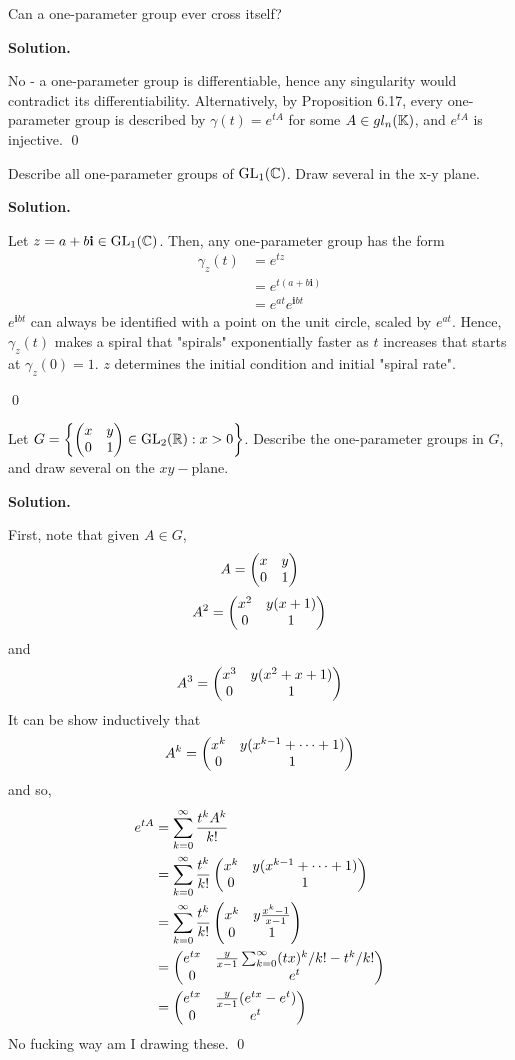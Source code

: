 \documentclass[12pt]{book}
\theoremstyle{definition}
\newenvironment{solution}
{%
  \par\noindent\textbf{Solution.}\quad
}
{%
  \qed\par
}
\begin{document}
\begin{taggedexercise}[Complete]
  Can a one-parameter group ever cross itself?
\end{taggedexercise}

\begin{solution}
  No - a one-parameter group is differentiable, hence any singularity would contradict its differentiability.
  Alternatively, by Proposition 6.17, every one-parameter group is described by $\gamma(t) = e^{tA}$ for some $A \in gl_n(\mathbb{K})$, and $e^{tA}$ is injective.
\end{solution}

\begin{taggedexercise}[WIP]
  Describe all one-parameter groups of $\mathrm{GL}_{1}(\mathbb{C})$.
  Draw several in the x-y plane.
\end{taggedexercise}

\begin{solution}
  Let $z = a + b\mathbf{i} \in \mathrm{GL}_{1}(\mathbb{C})$.
  Then, any one-parameter group has the form
  \[\begin{aligned}
    \gamma_z(t) &= e^{tz} \\
                &= e^{t(a+ b\mathbf{i})} \\
                &= e^{at}e^{\mathbf{i}bt}
  \end{aligned}
  \]
  $e^{\mathbf{i}bt}$ can always be identified with a point on the unit circle, scaled by $e^{at}$.
  Hence, $\gamma_z(t)$ makes a spiral that "spirals" exponentially faster as $t$ increases that starts at $\gamma_z(0) = 1$.
  $z$ determines the initial condition and initial "spiral rate".

\end{solution}

\begin{taggedexercise}[WIP]
  Let $G = \left\{ \begin{pmatrix} x & y \\ 0 & 1 \end{pmatrix} \in \mathrm{GL}_{2}(\mathbb{R}) : x > 0 \right\}$.
  Describe the one-parameter groups in $G$, and draw several on the $xy-$plane.
\end{taggedexercise}

\begin{solution}
  First, note that given $A \in G$,
  \[
   A = \begin{pmatrix} x & y \\ 0 & 1 \end{pmatrix}
  \]
  \[A^2 =  \begin{pmatrix} x^2 & y(x+1) \\ 0 & 1 \end{pmatrix}\]
  and
  \[A^3 = \begin{pmatrix} x^3 & y(x^2 + x + 1) \\ 0 & 1 \end{pmatrix}\]
  It can be show inductively that
  \[
  A^k = \begin{pmatrix} x^k & y(x^{k-1} + \cdots + 1) \\ 0 & 1 \end{pmatrix}
  \]
  and so,
  \[
  \begin{aligned}
    e^{tA} &= \sum_{k=0}^\infty \frac{t^kA^k}{k!} \\
           &= \sum_{k=0}^\infty \frac{t^k}{k!} \begin{pmatrix} x^k & y(x^{k-1} + \cdots + 1) \\ 0 & 1 \end{pmatrix} \\
           &= \sum_{k=0}^\infty \frac{t^k}{k!} \begin{pmatrix} x^k & y\frac{x^k-1}{x-1} \\ 0 & 1 \end{pmatrix} \\
           &= \begin{pmatrix} e^{tx} & \frac{y}{x-1}\sum_{k=0}^\infty (tx)^k/k! - t^k/k! \\ 0 & e^t \end{pmatrix} \\
           &= \begin{pmatrix} e^{tx} & \frac{y}{x-1}(e^{tx} - e^t) \\ 0 & e^t \end{pmatrix} \\
  \end{aligned}
  \]
  No fucking way am I drawing these.
\end{solution}
\end{document}
